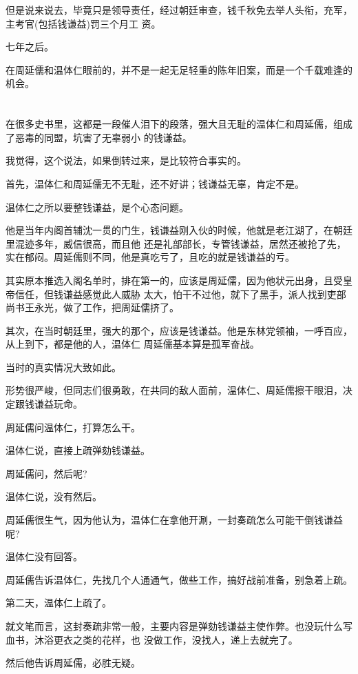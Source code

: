 \documentclass[11pt,a4paper,onecolumn]{article}
\begin{document}
但是说来说去，毕竟只是领导责任，经过朝廷审查，钱千秋免去举人头衔，充军，主考官(包括钱谦益)罚三个月工
资。

七年之后。

在周延儒和温体仁眼前的，并不是一起无足轻重的陈年旧案，而是一个千载难逢的机会。

\section[\thesection]{}

在很多史书里，这都是一段催人泪下的段落，强大且无耻的温体仁和周延儒，组成了恶毒的同盟，坑害了无辜弱小
的钱谦益。

我觉得，这个说法，如果倒转过来，是比较符合事实的。

首先，温体仁和周延儒无不无耻，还不好讲；钱谦益无辜，肯定不是。

温体仁之所以要整钱谦益，是个心态问题。

他是当年内阁首辅沈一贯的门生，钱谦益刚入伙的时候，他就是老江湖了，在朝廷里混迹多年，威信很高，而且他
还是礼部部长，专管钱谦益，居然还被抢了先，实在郁闷。周延儒则不同，他是真吃亏了，且吃的就是钱谦益的亏。

其实原本推选入阁名单时，排在第一的，应该是周延儒，因为他状元出身，且受皇帝信任，但钱谦益感觉此人威胁
太大，怕干不过他，就下了黑手，派人找到吏部尚书王永光，做了工作，把周延儒挤了。

其次，在当时朝廷里，强大的那个，应该是钱谦益。他是东林党领袖，一呼百应，从上到下，都是他的人，温体仁
周延儒基本算是孤军奋战。

当时的真实情况大致如此。

形势很严峻，但同志们很勇敢，在共同的敌人面前，温体仁、周延儒擦干眼泪，决定跟钱谦益玩命。

周延儒问温体仁，打算怎么干。

温体仁说，直接上疏弹劾钱谦益。

周延儒问，然后呢?

温体仁说，没有然后。

周延儒很生气，因为他认为，温体仁在拿他开涮，一封奏疏怎么可能干倒钱谦益呢?

温体仁没有回答。

周延儒告诉温体仁，先找几个人通通气，做些工作，搞好战前准备，别急着上疏。

第二天，温体仁上疏了。

就文笔而言，这封奏疏非常一般，主要内容是弹劾钱谦益主使作弊。也没玩什么写血书，沐浴更衣之类的花样，也
没做工作，没找人，递上去就完了。

然后他告诉周延儒，必胜无疑。
\end{document}

